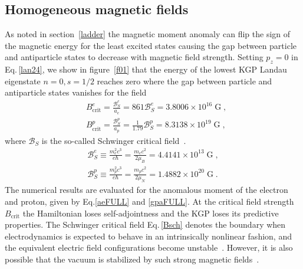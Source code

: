 \documentclass[epj]{svjour}
\begin{document}
\subsection{Homogeneous magnetic fields} \label{sbl}
As noted in section~\ref{ladder} the magnetic moment anomaly can flip the sign of the magnetic energy for the least excited states causing the gap between particle and antiparticle states to decrease with magnetic field strength. Setting $p_z=0$ in Eq.\,\eqref{lan24}, we show in figure~\ref{f01} that the energy of the lowest KGP Landau eigenstate $n=0, s=1/2$ reaches zero where the gap between particle and antiparticle states vanishes for the field
\begin{subequations}
\begin{alignat}{1}\label{Bcrit}
&B_\mathrm{crit}^{e}=\frac{\mathcal{B}_{S}^{e}}{a_{e}}=861\mathcal{B}_{S}^{e} =3.8006\times10^{16}\;\mathrm{G}\;,\\
&B_\mathrm{crit}^{p}=\frac{\mathcal{B}_{S}^{p}}{a_{p}}=\frac{1}{1.79}\mathcal{B}_{S}^{p}=8.3138\times10^{19}\;\mathrm{G}\;,
\end{alignat} 
\end{subequations}
where $\mathcal{B}_{S}$ is the so-called Schwinger critical field~\cite{Schwinger:1951nm}.
\begin{subequations}
\begin{alignat}{1}\label{Bsch}
\mathcal{B}_{S}^{e}\equiv\frac{{m_{e}^2}c^3}{e\hbar}=\frac{m_{e}c^2}{2\mu_B}=4.4141\times 10^{13}\;\mathrm{G}\;,\\
\mathcal{B}_{S}^{p}\equiv\frac{{m_{p}^2}c^3}{e\hbar}=\frac{m_{p}c^2}{2\mu_N}=1.4882\times 10^{20}\;\mathrm{G}\;.
\end{alignat}
\end{subequations}
The numerical results are evaluated for the anomalous moment of the electron and proton, given by Eq.\eqref{aeFULL} and \eqref{gpaFULL}. At the critical field strength $B_\mathrm{crit}$ the Hamiltonian loses self-adjointness and the KGP loses its predictive properties. The Schwinger critical field Eq.\,\eqref{Bsch} denotes the boundary when electrodynamics is expected to behave in an intrinsically nonlinear fashion, and the equivalent electric field configurations become unstable~\cite{Labun:2008re}. However, it is also possible that the vacuum is stabilized by such strong magnetic fields~\cite{Evans:2018kor}.
 
\end{document}
